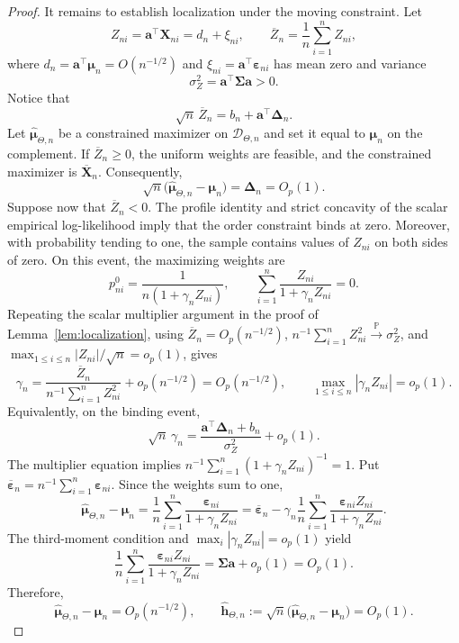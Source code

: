 \documentclass[11pt]{article}
\theoremstyle{remark}
\begin{document}
\begin{proof}
It remains to establish localization under the moving constraint. Let
$$Z_{ni}=\boldsymbol{a}^{\top}\boldsymbol{X}_{ni}=d_n+\xi_{ni},\qquad \overline{Z}_n=\frac{1}{n}\sum_{i=1}^nZ_{ni},$$
where $d_n=\boldsymbol{a}^{\top}\boldsymbol{\mu}_n=O(n^{-1/2})$ and $\xi_{ni}=\boldsymbol{a}^{\top}\boldsymbol{\varepsilon}_{ni}$ has mean zero and variance
$$\sigma_Z^2=\boldsymbol{a}^{\top}\boldsymbol{\Sigma}\boldsymbol{a}>0.$$
Notice that
$$\sqrt{n}\,\overline{Z}_n=b_n+\boldsymbol{a}^{\top}\boldsymbol{\Delta}_n.$$
Let $\widehat{\boldsymbol{\mu}}_{\Theta,n}$ be a constrained maximizer on $\mathcal{D}_{\Theta,n}$ and set it equal to $\boldsymbol{\mu}_n$ on the complement. If $\overline{Z}_n\geq0$, the uniform weights are feasible, and the constrained maximizer is $\overline{\boldsymbol{X}}_n$. Consequently,
$$\sqrt{n}\bigl(\widehat{\boldsymbol{\mu}}_{\Theta,n}-\boldsymbol{\mu}_n\bigr)=\boldsymbol{\Delta}_n=O_p(1).$$
Suppose now that $\overline{Z}_n<0$. The profile identity and strict concavity of the scalar empirical log-likelihood imply that the order constraint binds at zero. Moreover, with probability tending to one, the sample contains values of $Z_{ni}$ on both sides of zero. On this event, the maximizing weights are
$$p_{ni}^{0}=\frac{1}{n(1+\gamma_nZ_{ni})},\qquad \sum_{i=1}^n\frac{Z_{ni}}{1+\gamma_nZ_{ni}}=0.$$
Repeating the scalar multiplier argument in the proof of Lemma~\ref{lem:localization}, using $\overline{Z}_n=O_p(n^{-1/2})$, $n^{-1}\sum_{i=1}^nZ_{ni}^2\xrightarrow{\mathbb{P}}\sigma_Z^2$, and $\max_{1\leq i\leq n}|Z_{ni}|/\sqrt{n}=o_p(1)$, gives
$$\gamma_n=\frac{\overline{Z}_n}{n^{-1}\sum_{i=1}^nZ_{ni}^2}+o_p(n^{-1/2})=O_p(n^{-1/2}),\qquad \max_{1\leq i\leq n}|\gamma_nZ_{ni}|=o_p(1).$$
Equivalently, on the binding event,
$$\sqrt{n}\,\gamma_n=\frac{\boldsymbol{a}^{\top}\boldsymbol{\Delta}_n+b_n}{\sigma_Z^2}+o_p(1).$$
The multiplier equation implies $n^{-1}\sum_{i=1}^n(1+\gamma_nZ_{ni})^{-1}=1$. Put $\overline{\boldsymbol{\varepsilon}}_n=n^{-1}\sum_{i=1}^n\boldsymbol{\varepsilon}_{ni}$. Since the weights sum to one,
$$\widehat{\boldsymbol{\mu}}_{\Theta,n}-\boldsymbol{\mu}_n=\frac{1}{n}\sum_{i=1}^n\frac{\boldsymbol{\varepsilon}_{ni}}{1+\gamma_nZ_{ni}}=\overline{\boldsymbol{\varepsilon}}_n-\gamma_n\frac{1}{n}\sum_{i=1}^n\frac{\boldsymbol{\varepsilon}_{ni}Z_{ni}}{1+\gamma_nZ_{ni}}.$$
The third-moment condition and $\max_i|\gamma_nZ_{ni}|=o_p(1)$ yield
$$\frac{1}{n}\sum_{i=1}^n\frac{\boldsymbol{\varepsilon}_{ni}Z_{ni}}{1+\gamma_nZ_{ni}}=\boldsymbol{\Sigma}\boldsymbol{a}+o_p(1)=O_p(1).$$
Therefore,
$$\widehat{\boldsymbol{\mu}}_{\Theta,n}-\boldsymbol{\mu}_n=O_p(n^{-1/2}),\qquad \widehat{\boldsymbol{h}}_{\Theta,n}:=\sqrt{n}\bigl(\widehat{\boldsymbol{\mu}}_{\Theta,n}-\boldsymbol{\mu}_n\bigr)=O_p(1).$$


\end{proof}
\end{document}
